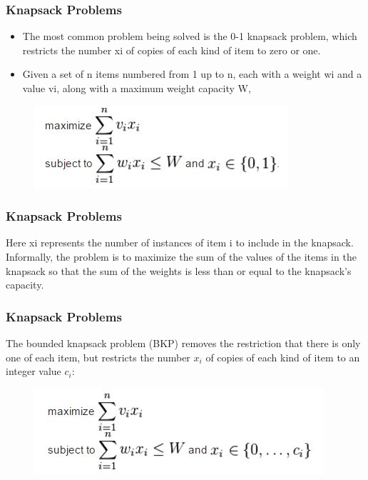 \documentclass{beamer}
\begin{document}
\begin{frame}
	\frametitle{Knapsack Problems}
	\Large
	\begin{itemize}
	\item The most common problem being solved is the 0-1 knapsack problem, which restricts the number xi of copies of each kind of item to zero or one. 
	\item Given a set of n items numbered from 1 up to n, each with a weight wi and a value vi, along with a maximum weight capacity W,
	\end{itemize}
\begin{figure}
\centering
\includegraphics[width=0.7\linewidth]{01knapsack}
\caption{}
\label{fig:01knapsack}
\end{figure}
\end{frame}
\begin{frame}
	\frametitle{Knapsack Problems}
	\Large
	Here xi represents the number of instances of item i to include in the knapsack. Informally, the problem is to maximize the sum of the values of the items in the knapsack so that the sum of the weights is less than or equal to the knapsack's capacity.
\end{frame}
\begin{frame}
	\frametitle{Knapsack Problems}
\Large
The bounded knapsack problem (BKP) removes the restriction that there is only one of each item, but restricts the number $x_i$ of copies of each kind of item to an integer value $c_i$:
\begin{figure}
\centering
\includegraphics[width=0.7\linewidth]{boundedknapsack}

\end{figure}
\end{frame}
\end{document}
